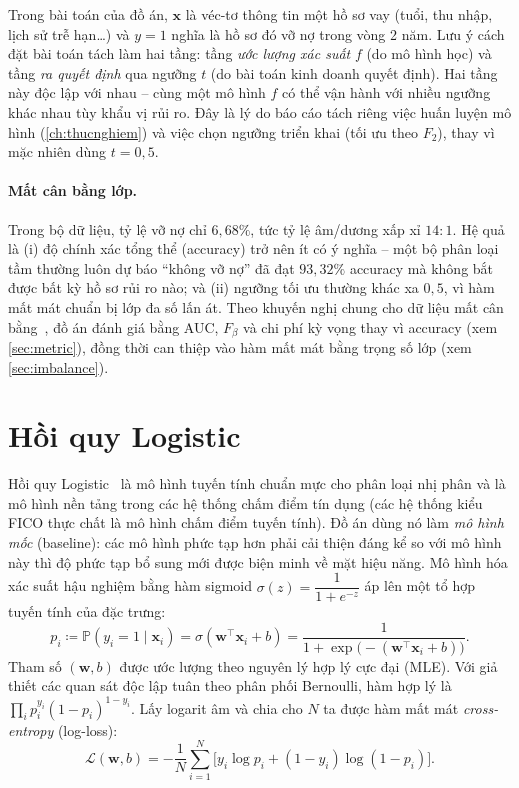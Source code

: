 \documentclass[12pt,a4paper,oneside]{report}
\theoremstyle{vnplain}
\theoremstyle{vndef}
\newcommand{\Prob}{\mathbb{P}}
\newcommand{\xv}{\mathbf{x}}
\newcommand{\wv}{\mathbf{w}}
\begin{document}
Trong bài toán của đồ án, $\xv$ là véc-tơ thông tin một hồ sơ vay (tuổi, thu nhập, lịch sử
trễ hạn\ldots) và $y=1$ nghĩa là hồ sơ đó vỡ nợ trong vòng 2 năm. Lưu ý cách đặt bài toán
tách làm hai tầng: tầng \emph{ước lượng xác suất} $f$ (do mô hình học) và tầng \emph{ra
quyết định} qua ngưỡng $t$ (do bài toán kinh doanh quyết định). Hai tầng này độc lập với
nhau -- cùng một mô hình $f$ có thể vận hành với nhiều ngưỡng khác nhau tùy khẩu vị rủi ro.
Đây là lý do báo cáo tách riêng việc huấn luyện mô hình (\cref{ch:thucnghiem}) và việc
chọn ngưỡng triển khai (tối ưu theo $F_2$), thay vì mặc nhiên dùng $t=0{,}5$.

\paragraph{Mất cân bằng lớp.} Trong bộ dữ liệu, tỷ lệ vỡ nợ chỉ $6{,}68\%$, tức tỷ lệ
âm/dương xấp xỉ $14{:}1$. Hệ quả là (i) độ chính xác tổng thể (accuracy) trở nên ít có ý nghĩa
-- một bộ phân loại tầm thường luôn dự báo ``không vỡ nợ'' đã đạt $93{,}32\%$ accuracy mà
không bắt được bất kỳ hồ sơ rủi ro nào; và (ii) ngưỡng tối ưu thường khác xa $0{,}5$, vì
hàm mất mát chuẩn bị lớp đa số lấn át. Theo khuyến nghị chung cho dữ liệu mất cân
bằng~\cite{he2009,james2021}, đồ án đánh giá bằng AUC, $F_\beta$ và chi phí kỳ vọng thay vì
accuracy (xem \cref{sec:metric}), đồng thời can thiệp vào hàm mất mát bằng trọng số lớp
(xem \cref{sec:imbalance}).

\section{Hồi quy Logistic}\label{sec:lr}
Hồi quy Logistic~\cite[Ch.~4.4]{hastie2009} là mô hình tuyến tính chuẩn mực cho phân loại
nhị phân và là mô hình nền tảng trong các hệ thống chấm điểm tín dụng (các hệ thống kiểu FICO
thực chất là mô hình chấm điểm tuyến tính). Đồ án dùng nó làm \emph{mô hình mốc}
(baseline): các mô hình phức tạp hơn phải cải thiện đáng kể so với mô hình này thì độ phức tạp bổ sung
mới được biện minh về mặt hiệu năng. Mô hình hóa xác suất hậu nghiệm bằng hàm sigmoid
$\sigma(z)=\dfrac{1}{1+e^{-z}}$ áp lên một tổ hợp tuyến tính của đặc trưng:
\begin{equation}
  p_i \coloneqq \Prob(y_i=1\mid \xv_i)=\sigma(\wv^\top\xv_i + b)
  =\frac{1}{1+\exp\!\big(-(\wv^\top\xv_i+b)\big)}.
  \label{eq:lr}
\end{equation}
Tham số $(\wv,b)$ được ước lượng theo nguyên lý hợp lý cực đại (MLE). Với giả thiết các
quan sát độc lập tuân theo phân phối Bernoulli, hàm hợp lý là
$\prod_i p_i^{y_i}(1-p_i)^{1-y_i}$. Lấy logarit âm và chia cho $N$ ta được hàm mất mát
\emph{cross-entropy} (log-loss):
\begin{equation}
  \mathcal{L}(\wv,b)=-\frac{1}{N}\sum_{i=1}^{N}\Big[y_i\log p_i+(1-y_i)\log(1-p_i)\Big].
  \label{eq:logloss}
\end{equation}
\end{document}
